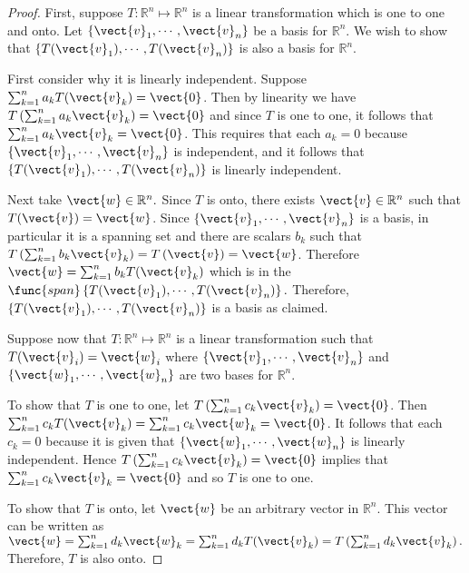 \begin{proof}
First, suppose $T:\mathbb{R}^n \mapsto \mathbb{R}^n$ is a linear
transformation which is one to one and onto. Let $\left\{
\vect{v}_{1},\cdots ,\vect{v}_{n}\right\} $ be a basis for
$\mathbb{R}^n$. We wish to show that $\left\{ T(\vect{v}_{1}),\cdots ,
T(\vect{v}_{n})\right\} $ is also a basis for $\mathbb{R}^n$. 

First consider why it is linearly independent. Suppose
$\sum_{k=1}^{n}a_{k}T(\vect{v}_{k})=\vect{0}$. Then by linearity we have $T\left(
\sum_{k=1}^{n}a_{k}\vect{v}_{k}\right) =\vect{0}$ and since $T$ is one
to one, it follows that $\sum_{k=1}^{n}a_{k}\vect{v}_{k}=\vect{0}$.
This requires that  each $a_{k}=0$ because $\left\{ \vect{v}_{1},\cdots,
\vect{v}_{n}\right\} $ is independent, and it follows that $\left\{
T(\vect{v}_{1}),\cdots , T(\vect{v}_{n})\right\} $ is linearly
independent. 


Next take $\vect{w}\in \mathbb{R}^n.$ Since $T$ is onto,
there exists $\vect{v}\in \mathbb{R}^n$ such that
$T(\vect{v})=\vect{w}$. Since $ \left\{ \vect{v}_{1},\cdots
,\vect{v}_{n}\right\} $ is a basis, in particular it is a spanning set
and there are scalars $b_{k}$ such that $T\left(
\sum_{k=1}^{n}b_{k}\vect{v} _{k}\right) =T\left( \vect{v}\right)
=\vect{w}$. Therefore $\vect{w} =\sum_{k=1}^{n}b_{k}T(\vect{v}_{k})$
which is in the $\func{span}\left\{ T(\vect{v}_{1}),\cdots ,
T(\vect{v}_{n})\right\} .$ Therefore, $\left\{ T(\vect{v}_{1}),\cdots
,T(\vect{v}_{n}) \right\} $ is a basis as claimed.

Suppose now that $T: \mathbb{R}^n \mapsto \mathbb{R}^n$ is a linear
transformation such that $T(\vect{v}_{i})=\vect{w}_{i}$ where
$\left\{\vect{v} _{1},\cdots ,\vect{v}_{n}\right\} $ and $\left\{
\vect{w}_{1},\cdots , \vect{w}_{n}\right\} $ are two bases for
$\mathbb{R}^n$. 

To show that $T$ is one to one, let $T\left(
\sum_{k=1}^{n}c_{k}\vect{v}_{k}\right) =\vect{0}$. Then
$\sum_{k=1}^{n}c_{k}T(\vect{v}_{k})=\sum_{k=1}^{n}c_{k}\vect{w}_{k}=\vect{
0}$. It follows that each $c_{k} = 0$ because it is given that
$\left\{ \vect{w} _{1},\cdots ,\vect{w}_{n}\right\} $ is linearly
independent. Hence $T\left( \sum_{k=1}^{n}c_{k}\vect{v}_{k}\right)
=\vect{0}$ implies that $\sum_{k=1}^{n}c_{k}\vect{v}_{k}=\vect{0}$ and
so $T$ is one to one.  

To show that $T$ is onto, let $\vect{w}$ be an arbitrary vector in
$\mathbb{R}^n$. This vector can be written as $\vect{w} =
\sum_{k=1}^{n}d_k\vect{w}_k =
\sum_{k=1}^{n}d_{k}T(\vect{v}_{k})=T\left( \sum_{k=1}^{n}d_{k}
\vect{v}_{k}\right) .$  Therefore, $T$ is also onto. 
\end{proof}

